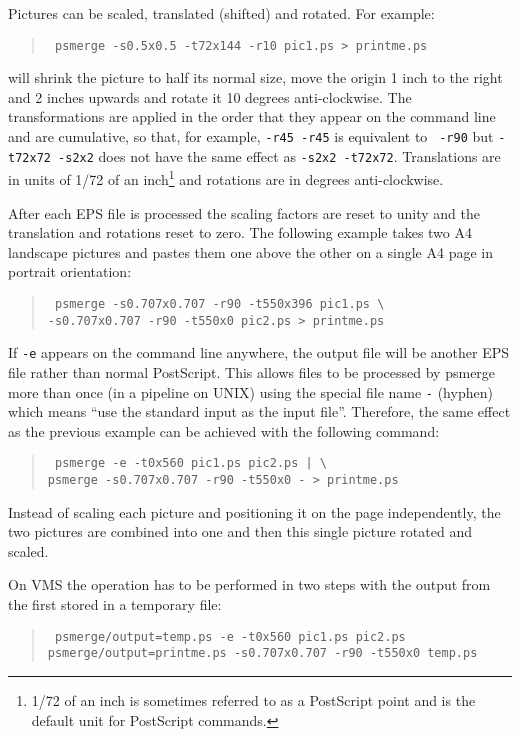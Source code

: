 Pictures can be scaled, translated (shifted) and rotated. For example:
\begin{quote}\tt
psmerge -s0.5x0.5 -t72x144 -r10 pic1.ps > printme.ps
\end{quote}
will shrink the picture to half its normal size, move the origin 1 inch to the
right and 2 inches upwards and rotate it 10 degrees anti-clockwise. The
transformations are applied in the order that they appear on the command line
and are cumulative, so that, for example, {\tt -r45 -r45} is equivalent to {\tt
-r90} but {\tt -t72x72 -s2x2} does not have the same effect as {\tt -s2x2
-t72x72}. Translations are in units of 1/72 of an inch\footnote{1/72 of an
inch is sometimes referred to as a PostScript point and is the default unit for
PostScript commands.} and rotations are in degrees anti-clockwise.

After each EPS file is processed the scaling factors are reset to unity and the
translation and rotations reset to zero. The following example takes two A4
landscape pictures and pastes them one above the other on a single A4 page in
portrait orientation:
\begin{quote}\tt
psmerge -s0.707x0.707 -r90 -t550x396 pic1.ps \verb+\+\\
\hspace*{1cm}-s0.707x0.707 -r90 -t550x0 pic2.ps > printme.ps
\end{quote}

If {\tt -e} appears on the command line anywhere, the output file will be
another EPS file rather than normal PostScript. This allows files to be
processed by psmerge more than once (in a pipeline on UNIX) using the special
file name {\tt -} (hyphen) which means ``use the standard input as the input
file''. Therefore, the same effect as the previous example can be achieved with
the following command:
\begin{quote}\tt
psmerge -e -t0x560 pic1.ps pic2.ps | \verb+\+\\
\hspace*{1cm}psmerge -s0.707x0.707 -r90 -t550x0 - > printme.ps
\end{quote}
Instead of scaling each picture and positioning it on the page independently,
the two pictures are combined into one and then this single picture rotated and
scaled.

On VMS the operation has to be performed in two steps with the output from
the first stored in a temporary file:
\begin{quote}\tt
psmerge/output=temp.ps  -e -t0x560 pic1.ps pic2.ps \\
psmerge/output=printme.ps -s0.707x0.707 -r90 -t550x0 temp.ps
\end{quote}


